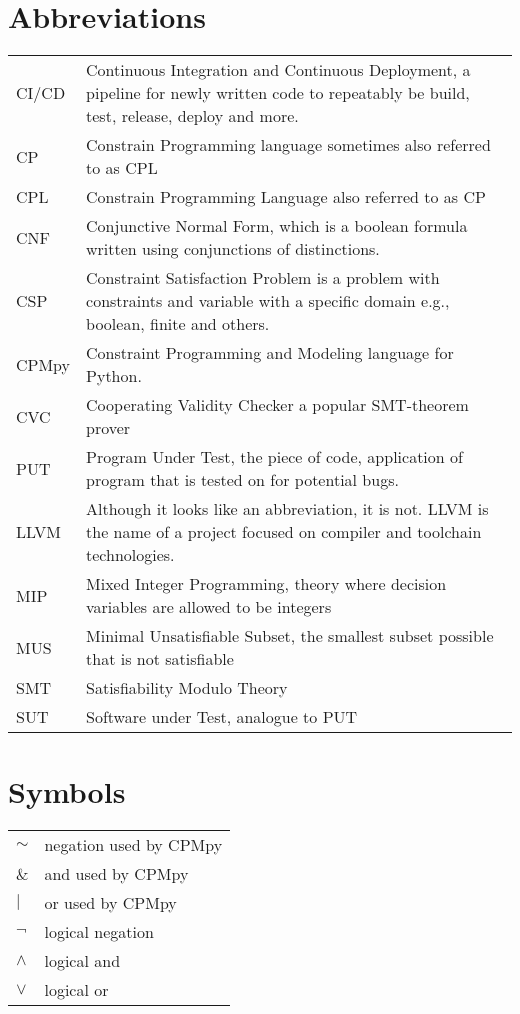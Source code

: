 \documentclass[master=cws,masteroption=se,english]{kulemt} %
\begin{document}
\section*{Abbreviations}
\begin{flushleft}
  \renewcommand{\arraystretch}{1.1}
  \begin{tabularx}{\textwidth}{@{}p{14mm}X@{}}
  	
	CI/CD & Continuous Integration and Continuous Deployment, a pipeline for newly written code to repeatably be build, test, release, deploy and more. \\
    CP & Constrain Programming language sometimes also referred to as CPL \\
    CPL & Constrain Programming Language also referred to as CP \\
    CNF & Conjunctive Normal Form, which is a boolean formula written using conjunctions of distinctions. \\
    CSP & Constraint Satisfaction Problem is a problem with constraints and variable with a specific domain e.g., boolean, finite and others.\\
    CPMpy & Constraint Programming and Modeling language for Python.\\
    CVC & Cooperating Validity Checker a popular SMT-theorem prover \\
    PUT & Program Under Test, the piece of code, application of program that is tested on for potential bugs. \\
    LLVM & Although it looks like an abbreviation, it is not. LLVM is the name of a project focused on compiler and toolchain technologies. \\
    MIP & Mixed Integer Programming, theory where decision variables are allowed to be integers \\
    MUS & Minimal Unsatisfiable Subset, the smallest subset possible that is not satisfiable \\
    SMT & Satisfiability Modulo Theory \\
    SUT & Software under Test, analogue to PUT \\
  \end{tabularx}
\end{flushleft}

\section*{Symbols}
\begin{flushleft}
  \renewcommand{\arraystretch}{1.1}
  \begin{tabularx}{\textwidth}{@{}p{14mm}X@{}}
 	$\sim$ & negation used by CPMpy\\
 	$\&$ & and used by CPMpy\\
 	$\vert$ & or used by CPMpy\\
  	$\neg$ & logical negation \\
  	$\land$ & logical and \\
  	$\lor$  & logical or \\
  \end{tabularx}
\end{flushleft}
\end{document}
